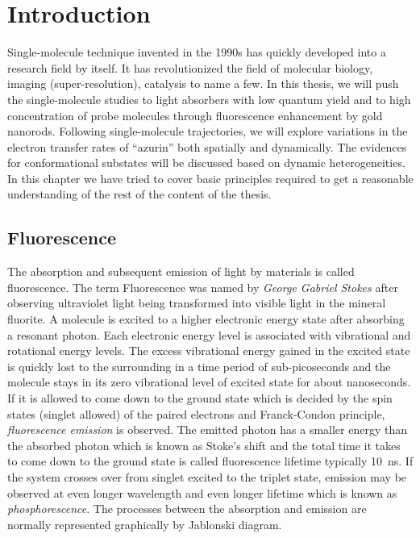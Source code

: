 \chapter{Introduction}
\label{chapter:intro}
\graphicspath{{./chapters/c1_intro/figures/}}
Single-molecule technique invented in the 1990s has quickly developed into a research field by itself. It has revolutionized the field of molecular biology, imaging (super-resolution), catalysis to name a few. In this thesis, we will push the single-molecule studies to light absorbers with low quantum yield and to high concentration of probe molecules through fluorescence enhancement by gold nanorods. Following single-molecule trajectories, we will explore variations in the electron transfer rates of ``azurin'' both spatially and dynamically. The evidences for conformational substates will be discussed based on dynamic heterogeneities. In this chapter we have tried to cover basic principles required to get a reasonable understanding of the rest of the content of the thesis.  


\section{Fluorescence}
The absorption and subsequent emission of light by materials is called fluorescence.
The term Fluorescence was named by \textit{George Gabriel Stokes} after observing ultraviolet light being transformed into visible light in the mineral fluorite.\cite{Stokes1852}
A molecule is excited to a higher electronic energy state after absorbing a resonant photon.
Each electronic energy level is associated with vibrational and rotational energy levels.
The excess vibrational energy gained in the excited state is quickly lost to the surrounding in a time period of sub-picoseconds and the molecule stays in its zero vibrational level of excited state for about nanoseconds.
If it is allowed to come down to the ground state which is decided by the spin states (singlet allowed) of the paired electrons and Franck-Condon principle, \textit{fluorescence emission} is observed.
The emitted photon has a smaller energy than the absorbed photon which is known as Stoke's shift and the total time it takes to come down to the ground state is called fluorescence lifetime typically \SI{10}{\ns}.
If the system crosses over from singlet excited to the triplet state, emission may be observed at even longer wavelength and even longer lifetime which is known as \textit{phosphorescence}.
The processes between the absorption and emission are normally represented graphically by Jablonski diagram.\cite{RohatgiMukherjee1979k,Lakowicz1999book}

